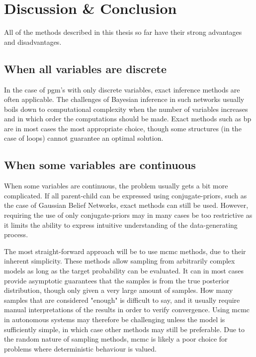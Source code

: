 \chapter{Discussion \& Conclusion}\label{chap:discussion}

All of the methods described in this thesis so far have their strong advantages and disadvantages. 

\section{When all variables are discrete}
In the case of \acrshort{pgm}'s with only discrete variables, exact inference methods are often applicable. The challenges of Bayesian inference in such networks usually boils down to computational complexity when the number of variables increases and in which order the computations should be made. Exact methods such as \acrshort{bp} are in most cases the most appropriate choice, though some structures (in the case of loops) cannot guarantee an optimal solution. 

\section{When some variables are continuous}
When some variables are continuous, the problem usually gets a bit more complicated. If all parent-child can be expressed using conjugate-priors, such as the case of Gaussian Belief Networks, exact methods can still be used. However, requiring the use of only conjugate-priors may in many cases be too restrictive as it limits the ability to express intuitive understanding of the data-generating process. 

The most straight-forward approach will be to use \acrshort{mcmc} methods, due to their inherent simplicity. These methods allow sampling from arbitrarily complex models as long as the target probability can be evaluated. It can in most cases provide asymptotic guarantees that the samples is from the true posterior distribution, though only given a very large amount of samples. How many samples that are considered "enough" is difficult to say, and it usually require manual interpretations of the results in order to verify convergence. Using \acrshort{mcmc} in autonomous systems may therefore be challenging unless the model is sufficiently simple, in which case other methods may still be preferable. Due to the random nature of sampling methods, \acrshort{mcmc} is likely a poor choice for problems where deterministic behaviour is valued. 

